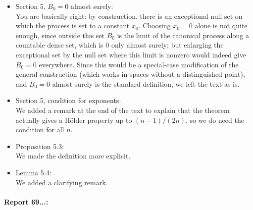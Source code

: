 \documentclass[11pt]{article}
\begin{document}
\begin{itemize}
  \item Section 5, $B_0 = 0$ almost surely: \\{\color{blue}You are basically right: by construction, there is an exceptional null set on which the process is set to a constant $x_0$. Choosing $x_0 = 0$ alone is not quite enough, since outside this set $B_0$ is the limit of the canonical process along a countable dense set, which is $0$ only almost surely; but enlarging the exceptional set by the null set where this limit is nonzero would indeed give $B_0 = 0$ everywhere. Since this would be a special-case modification of the general construction (which works in spaces without a distinguished point), and $B_0 = 0$ almost surely is the standard definition, we left the text as is.}
  \item Section 5, condition for exponents: \\ {\color{blue} We added a remark at the end of the text to explain that the theorem actually gives a Hölder property up to $(n-1)/(2n)$, so we do need the condition for all $n$.}
  \item Proposition 5.3: \\{\color{blue}We made the definition more explicit.}
  \item Lemma 5.4: \\{\color{blue}We added a clarifying remark.}
\end{itemize}

\paragraph{Report 69...:}
\end{document}
